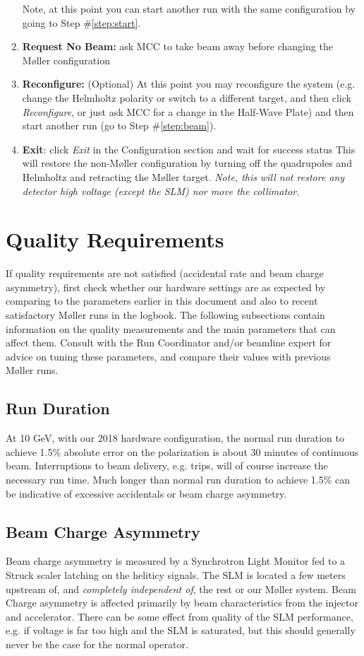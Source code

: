\documentclass[amsmath,amssymb,notitlepage,12pt]{revtex4}
\begin{document}
\begin{enumerate}
    \subitem Note, at this point you can start another run with the same configuration by going to Step \#\ref{step:start}.
\item {\bf Request No Beam:} ask MCC to take beam away before changing the M{\o}ller configuration
\item {\bf Reconfigure:}  (Optional)  At this point you may reconfigure the system (e.g. change the Helmholtz polarity or switch to a different target, and then click {\em Reconfigure}, or just ask MCC for a change in the Half-Wave Plate) and then start another run (go to Step \#\ref{step:beam}).
\item {\bf Exit}: click {\em Exit} in the Configuration section and wait for success status
    \subitem  This will restore the non-M{\o}ller configuration by turning off the quadrupoles and Helmholtz and retracting the M{\o}ller target.  {\em Note, this will not restore any detector high voltage (except the SLM) nor move the collimator}. 
\end{enumerate}

\newpage
\section{Quality Requirements}\label{sec:knobs}

If quality requirements are not satisfied (accidental rate and beam charge asymmetry), first check whether our hardware settings are as expected by comparing to the parameters earlier in this document and also to recent satisfactory M{\o}ller runs in the logbook.  The following subsections contain information on the quality measurements and the main parameters that can affect them.  Consult with the Run Coordinator and/or beamline expert for advice on tuning these parameters, and compare their values with previous M{\o}ller runs.

\subsection{Run Duration}
At 10 GeV, with our 2018 hardware configuration, the normal run duration to achieve 1.5\% absolute error on the polarization is about 30 minutes of continuous beam.  Interruptions to beam delivery, e.g. trips, will of course increase the necessary run time.  Much longer than normal run duration to achieve 1.5\% can be indicative of excessive accidentals or beam charge asymmetry.

\subsection{Beam Charge Asymmetry}
Beam charge asymmetry is measured by a Synchrotron Light Monitor fed to a Struck scaler latching on the heliticy signals.  The SLM is located a few meters upstream of, and {\em completely independent of}, the rest or our M{\o}ller system.  Beam Charge asymmetry is affected primarily by beam characteristics from the injector and accelerator.  There can be some effect from quality of the SLM performance, e.g. if voltage is far too high and the SLM is saturated, but this should generally never be the case for the normal operator.
\end{document}
